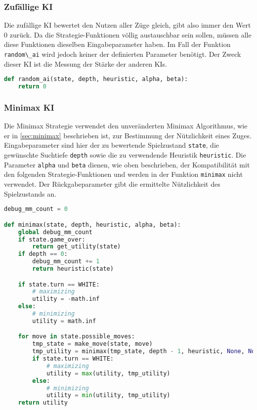 \hypertarget{zufuxe4llige-ki}{%
\subsubsection{Zufällige KI}\label{zufuxe4llige-ki}}

Die zufällige \ac{KI} bewertet den Nutzen aller Züge gleich, gibt also
immer den Wert \(0\) zurück. Da die Strategie-Funktionen völlig
austauschbar sein sollen, müssen alle diese Funktionen dieselben
Eingabeparameter haben. Im Fall der Funktion
\passthrough{\lstinline!random\_ai!} wird jedoch keiner der definierten
Parameter benötigt. Der Zweck dieser \ac{KI} ist die Messung der Stärke
der anderen \acp{KI}.

\begin{lstlisting}[language=Python]
def random_ai(state, depth, heuristic, alpha, beta):
    return 0
\end{lstlisting}

\hypertarget{minimax-ki}{%
\subsubsection{Minimax KI}\label{minimax-ki}}

Die Minimax Strategie verwendet den unveränderten Minimax Algorithmus,
wie er in \autoref{sec:minimax} beschrieben ist, zur Bestimmung der
Nützlichkeit eines Zuges. Eingabeparameter sind hier der zu bewertende
Spielzustand \passthrough{\lstinline!state!}, die gewünschte Suchtiefe
\passthrough{\lstinline!depth!} sowie die zu verwendende Heuristik
\passthrough{\lstinline!heuristic!}. Die Parameter
\passthrough{\lstinline!alpha!} und \passthrough{\lstinline!beta!}
dienen, wie oben beschrieben, der Kompatibilität mit den folgenden
Strategie-Funktionen und werden in der Funktion
\passthrough{\lstinline!minimax!} nicht verwendet. Der Rückgabeparameter
gibt die ermittelte Nützlichkeit des Spielzustands an.

\begin{lstlisting}[language=Python]
debug_mm_count = 0

def minimax(state, depth, heuristic, alpha, beta):
    global debug_mm_count
    if state.game_over:
        return get_utility(state)
    if depth == 0:
        debug_mm_count += 1
        return heuristic(state)

    if state.turn == WHITE:
        # maximizing
        utility = -math.inf
    else:
        # minimizing
        utility = math.inf

    for move in state.possible_moves:
        tmp_state = make_move(state, move)
        tmp_utility = minimax(tmp_state, depth - 1, heuristic, None, None)
        if state.turn == WHITE:
            # maximizing
            utility = max(utility, tmp_utility)
        else:
            # minimizing
            utility = min(utility, tmp_utility)
    return utility
\end{lstlisting}

